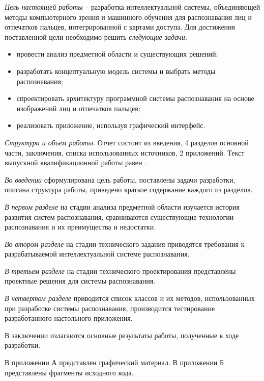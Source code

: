 \emph{Цель настоящей работы} – разработка интеллектуальной системы, объединяющей методы компьютерного зрения и машинного обучения для распознавания лиц и отпечатков пальцев, интегрированной с картами доступа. Для достижения поставленной цели необходимо решить \emph{следующие задачи:}
\begin{itemize}
\item провести анализ предметной области и существующих решений;
\item разработать концептуальную модель системы и выбрать методы распознавания;
\item спроектировать архитектуру программной системы распознавания на основе изображений лиц и отпечатков пальцев;
\item реализовать приложение, используя графический интерфейс.
\end{itemize}

\emph{Структура и объем работы.} Отчет состоит из введения, 4 разделов основной части, заключения, списка использованных источников, 2 приложений. Текст выпускной квалификационной работы равен .

\emph{Во введении} сформулирована цель работы, поставлены задачи разработки, описана структура работы, приведено краткое содержание каждого из разделов.

\emph{В первом разделе} на стадии анализа предметной области изучается история развития систем распознавания, сравниваются существующие технологии распознавания и их преимущества и недостатки.

\emph{Во втором разделе} на стадии технического задания приводятся требования к разрабатываемой интеллектуальной системе распознавания.

\emph{В третьем разделе} на стадии технического проектирования представлены проектные решения для системы распознавания.

\emph{В четвертом разделе} приводится список классов и их методов, использованных при разработке системы распознавания, производится тестирование разработанного настольного приложения.

В заключении излагаются основные результаты работы, полученные в ходе разработки.

В приложении А представлен графический материал.
В приложении Б представлены фрагменты исходного кода. 
